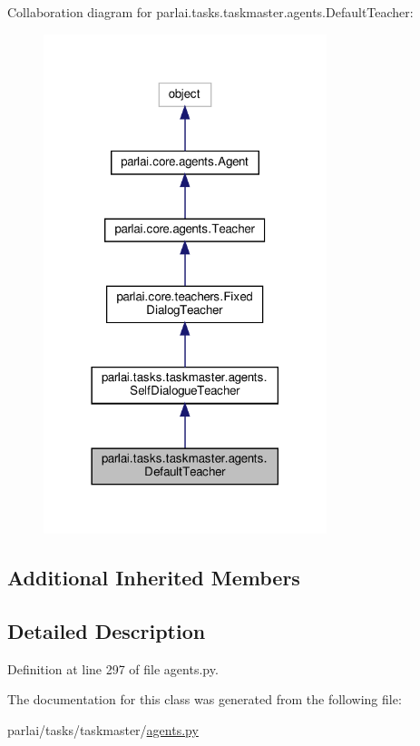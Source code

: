 Collaboration diagram for parlai.\+tasks.\+taskmaster.\+agents.\+Default\+Teacher\+:
\nopagebreak
\begin{figure}[H]
\begin{center}
\leavevmode
\includegraphics[width=234pt]{df/d66/classparlai_1_1tasks_1_1taskmaster_1_1agents_1_1DefaultTeacher__coll__graph}
\end{center}
\end{figure}
\subsection*{Additional Inherited Members}


\subsection{Detailed Description}


Definition at line 297 of file agents.\+py.



The documentation for this class was generated from the following file\+:\begin{DoxyCompactItemize}
\item 
parlai/tasks/taskmaster/\hyperlink{parlai_2tasks_2taskmaster_2agents_8py}{agents.\+py}\end{DoxyCompactItemize}
